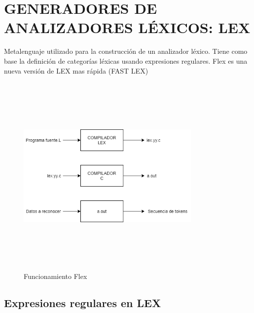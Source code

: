 \section{GENERADORES DE ANALIZADORES LÉXICOS: LEX}

Metalenguaje utilizado para la construcción de un analizador léxico. Tiene  como base la definición de categorías léxicas usando expresiones regulares. Flex es una nueva versión de LEX mas rápida (FAST LEX)

\begin{figure}[H]
    \centering
    \includegraphics[width=0.8\textwidth, height=10cm,keepaspectratio]{chapters/chapter2/figures/Flex Funcionamiento.png}
    \caption{Funcionamiento Flex}
    \label{fig:my_label}
\end{figure}



\subsection{Expresiones regulares en LEX}


